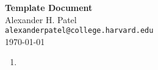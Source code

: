 \documentclass[12pt]{article}
\theoremstyle{definition}
\begin{document}
\begin{center}
\textbf{Template Document} \\
Alexander H. Patel \\
{\tt alexanderpatel@college.harvard.edu} \\
\today
\end{center}

\begin{enumerate}
    \itemsep0em 
	\item 
\end{enumerate}
\end{document}
